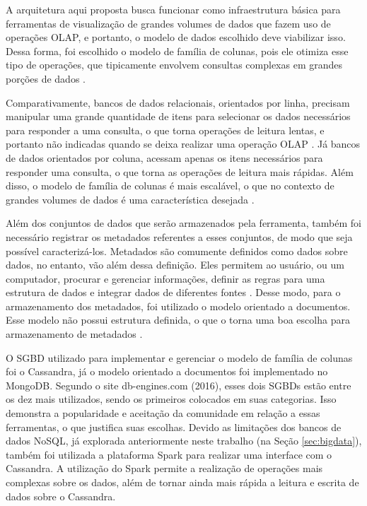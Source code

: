 A arquitetura aqui proposta busca funcionar como infraestrutura básica para ferramentas de
visualização de grandes volumes de dados que fazem uso de operações OLAP, e portanto, 
o modelo de dados escolhido deve viabilizar isso. Dessa forma, foi escolhido o modelo de 
família de colunas, pois ele otimiza esse tipo de operações, que tipicamente envolvem
consultas complexas em grandes porções de dados \cite{sorjonen2012olap}. 

Comparativamente, bancos de dados relacionais, orientados por linha, precisam manipular uma 
grande quantidade de itens para selecionar os dados necessários para responder a uma consulta, 
o que torna operações de leitura lentas, e portanto não indicadas quando se deixa realizar 
uma operação OLAP \cite{sorjonen2012olap}. Já bancos de dados orientados por coluna, acessam 
apenas os itens necessários para responder uma consulta, o que torna as operações de leitura
mais rápidas. Além disso, o modelo de família de colunas é mais escalável, o que no contexto
de grandes volumes de dados é uma característica desejada \cite{moniruzzaman2013nosql}.

Além dos conjuntos de dados que serão armazenados pela ferramenta, também foi necessário 
registrar os metadados referentes a esses conjuntos, de modo que seja possível 
caracterizá-los. Metadados são comumente definidos como dados sobre dados, no entanto, vão 
além dessa definição. Eles permitem ao usuário, ou um computador, procurar e gerenciar 
informações, definir as regras para uma estrutura de dados e integrar dados de diferentes 
fontes \cite{turner2002metadata}. Desse modo, para o armazenamento dos metadados, foi 
utilizado o modelo orientado a documentos. Esse modelo não possui 
estrutura definida, o que o torna uma boa escolha para armazenamento de metadados 
\cite{de2010nosql}.

O SGBD utilizado para implementar e gerenciar o modelo de família de colunas foi o 
Cassandra, já o modelo orientado a documentos foi implementado no MongoDB. 
Segundo o site db-engines.com (2016), esses dois SGBDs estão entre os dez mais utilizados, 
sendo os primeiros colocados em suas categorias. Isso demonstra a popularidade e aceitação 
da comunidade em relação a essas ferramentas, o que justifica suas escolhas. Devido as 
limitações dos bancos de dados NoSQL, já explorada anteriormente neste trabalho 
(na Seção \ref{sec:bigdata}), também foi utilizada a plataforma Spark para realizar uma 
interface com o Cassandra. A utilização do Spark permite a realização de operações mais 
complexas sobre os dados, além de tornar ainda mais rápida a leitura e escrita de dados 
sobre o Cassandra.

